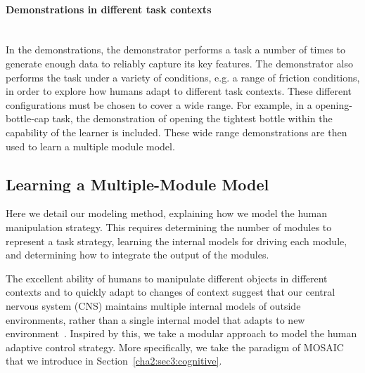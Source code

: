 \paragraph{Demonstrations in different task contexts}  ~\\
In the demonstrations, the demonstrator performs a task a number of
times to generate enough data to reliably capture its key features.
The demonstrator also performs the task under a variety of conditions, e.g. a range of friction conditions, in order to explore how humans adapt to different task contexts. These different configurations must be chosen to cover a wide range.
For example, in a opening-bottle-cap task, the demonstration of opening
the tightest bottle within the capability of the learner is
included. These wide range demonstrations are then used to learn a
multiple module model.

\subsection{Learning a Multiple-Module Model}
\label{cha4:sec2:learn}
Here we detail our modeling method, explaining how we model the human manipulation strategy.  This requires determining the number of modules to represent a task strategy, learning the internal models for driving each
module, and determining how to integrate the output of the modules.

The excellent ability of humans to manipulate different objects in different contexts and to quickly adapt to changes of context suggest that our central nervous system (CNS) maintains multiple internal models of outside environments, rather than a single internal model that adapts to new environment~\cite{neilson1985acquisition}.
Inspired by this, we take a modular approach to model the human adaptive control strategy. More specifically, we take the paradigm of MOSAIC~\cite{haruno2001mosaic} that we introduce in Section~\ref{cha2:sec3:cognitive}.

